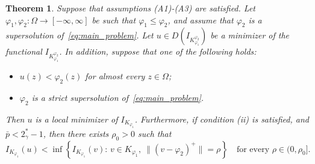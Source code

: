 \documentclass[11pt]{article}
\newtheorem{theorem}{Theorem}[section] %
\begin{document}
\begin{theorem}
\label{thm:local_minimizer_from_supersolution}
Suppose that assumptions \textnormal{(A1)}-\textnormal{(A3)} are satisfied. Let $\varphi_1,\varphi_2:\Omega \to [-\infty,\infty]$ be such that $\varphi_1 \leq \varphi_2$, and assume that $\varphi_2$ is a supersolution of~\eqref{eq:main_problem}. Let $u \in D(I_{K_{\varphi_1}^{\varphi_2}})$ be a minimizer of the functional $I_{K_{\varphi_1}^{\varphi_2}}$. In addition, suppose that one of the following holds:
\begin{itemize}
    \item[(i)] $u(z) < \varphi_2(z)$ for almost every $z \in \Omega$;
    \item[(ii)] $\varphi_2$ is a strict supersolution of~\eqref{eq:main_problem}.
\end{itemize}
Then $u$ is a local minimizer of $I_{K_{\varphi_1}}$. Furthermore, if condition \textnormal{(ii)} is satisfied, and $\bar p < 2_{\gamma}^{*}-1$, then there exists $\rho_0>0$ such that
\begin{equation}
\label{eq:strict_local_minimum_estimate}
I_{K_{\varphi_1}}(u)
<
\inf \left\{
I_{K_{\varphi_1}}(v):\, v \in K_{\varphi_1},\ 
\bigl\|(v-\varphi_2)^{+}\bigr\|=\rho
\right\}
\quad \text{for every } \rho \in (0,\rho_0].
\end{equation}
\end{theorem}
\end{document}
